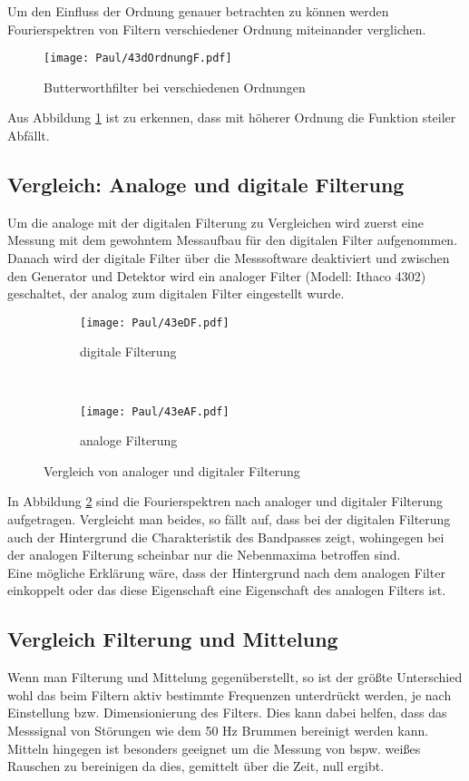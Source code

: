 Um den Einfluss der Ordnung genauer betrachten zu können werden Fourierspektren von Filtern verschiedener Ordnung miteinander verglichen.

\begin{figure}[h]
    \centering
    \texttt{[image: Paul/43dOrdnungF.pdf]}
    \caption{Butterworthfilter bei verschiedenen Ordnungen}
    \label{fig:43dOrd}
\end{figure}

Aus Abbildung \ref{fig:43dOrd} ist zu erkennen, dass mit höherer Ordnung die Funktion steiler Abfällt.

\newpage
\subsection{Vergleich: Analoge und digitale Filterung}
Um die analoge mit der digitalen Filterung zu Vergleichen wird zuerst eine Messung mit dem gewohntem Messaufbau für den digitalen Filter aufgenommen. Danach wird der digitale Filter über die Messsoftware deaktiviert und zwischen den Generator und Detektor wird ein analoger Filter (Modell: Ithaco 4302) geschaltet, der analog zum digitalen Filter eingestellt wurde.

\begin{figure}[h]
    \centering
    \begin{subfigure}{0.9\textwidth}
        \centering
        \texttt{[image: Paul/43eDF.pdf]}
        \caption{digitale Filterung}
    \end{subfigure}
    \\
    \begin{subfigure}{0.9\textwidth}
        \centering
        \texttt{[image: Paul/43eAF.pdf]}
        \caption{analoge Filterung}
    \end{subfigure}
    \caption{Vergleich von analoger und digitaler Filterung}
    \label{fig:43e}
\end{figure}
\newpage
In Abbildung \ref{fig:43e} sind die Fourierspektren nach analoger und digitaler Filterung aufgetragen. Vergleicht man beides, so fällt auf, dass bei der digitalen Filterung auch der Hintergrund die Charakteristik des Bandpasses zeigt, wohingegen bei der analogen Filterung scheinbar nur die Nebenmaxima betroffen sind.\\
Eine mögliche Erklärung wäre, dass der Hintergrund nach dem analogen Filter einkoppelt oder das diese Eigenschaft eine Eigenschaft des analogen Filters ist.


\subsection{Vergleich Filterung und Mittelung}
Wenn man Filterung und Mittelung gegenüberstellt, so ist der größte Unterschied wohl das beim Filtern aktiv bestimmte Frequenzen unterdrückt werden, je nach Einstellung bzw. Dimensionierung des Filters. Dies kann dabei helfen, dass das Messsignal von Störungen wie dem 50 Hz Brummen bereinigt werden kann.\\
Mitteln hingegen ist besonders geeignet um die Messung von bspw. weißes Rauschen zu bereinigen da dies, gemittelt über die Zeit, null ergibt.